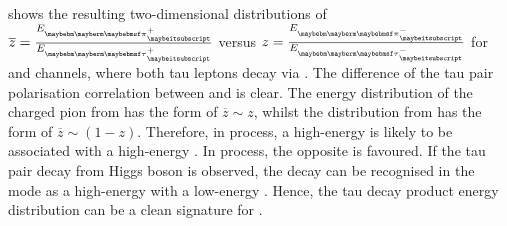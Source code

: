  shows the resulting two-dimensional distributions of  $\overline{z} = \frac{E_{\Ppiplus}}{E_{\APtauon}}$ versus  $z = \frac{E_{\Ppiminus}}{E_{\Ptauon}}$ for \ZToTauTau and \HiggsToTauTau channels, where both tau leptons decay via \tauToPion. The difference of the tau pair polarisation correlation between \PZ and \PHiggs  is clear. The energy distribution of the charged pion from \ZToTauTau has the form of $\overline{z}  \sim z$, whilst the distribution from  \HiggsToTauTau has the form of $\overline{z}  \sim (1-z)$. Therefore, in \ZToTauTau process, a high-energy \Pgppm  is likely to be associated with a high-energy \Pgpmp. In \HiggsToTauTau process, the opposite is favoured. If the tau pair decay from Higgs boson is observed, the decay can be recognised in the \tauToPion mode as a high-energy \Pgppm with a low-energy \Pgpmp. Hence, the tau decay product energy distribution can be a clean signature for \HiggsToTauTau.


